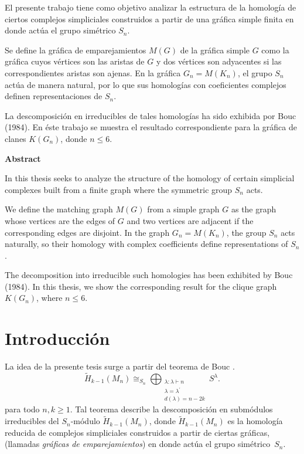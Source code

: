 \documentclass[12pt]{book}
\theoremstyle{definition}
\newcounter{in}
\newcounter{ini}
\begin{document}
El presente trabajo tiene como objetivo analizar la estructura de
la homología de ciertos complejos simpliciales construidos a partir de una
gráfica simple finita en donde actúa el grupo simétrico $S_{n}$.

Se define la gráfica de emparejamientos $M(G)$ de la gráfica simple
$G$ como la gráfica cuyos vértices son las aristas de $G$ y dos
vértices son adyacentes si las correspondientes aristas son ajenas. En
la gráfica $G_{n}=M(K_{n})$, el grupo $S_{n}$ actúa de manera natural, por
lo que sus homologías con coeficientes complejos definen
representaciones de $S_{n}$. 

La descomposición en irreducibles de tales homologías ha sido exhibida
por Bouc (1984). En éste trabajo se muestra el resultado correspondiente para la
gráfica de clanes $K(G_{n})$, donde $n\leq 6$.

\vspace{2cm}

\begin{flushleft}
  {\bfseries\Large Abstract}
\end{flushleft}

In this thesis seeks to analyze the structure of the homology of
certain simplicial complexes built from a finite graph where the
symmetric group $S_{n}$ acts. 

We define the matching graph $M(G)$ from a simple graph $G$ as 
the graph whose vertices are the edges of $G$ and two vertices are
adjacent if the corresponding edges are disjoint. In the graph
$G_{n}=M(K_{n})$, the group $S_{n}$ acts naturally, so their homology
with complex coefficients define representations of $S_{n}$. 

The decomposition into irreducible such homologies has been exhibited 
by Bouc (1984). In this thesis, we show the corresponding result for
the clique graph $K(G_{n})$, where $n\leq 6$.

\chapter*{Introducción}

La idea de la presente tesis surge a partir del teorema de Bouc
\cite{MR756517}. 
\begin{equation*}
  \widetilde H_{k-1}(M_{n})\cong_{S_{n}}\bigoplus_{\substack{\lambda:\lambda\vdash n\\
      \lambda=\lambda^{'}\\d(\lambda)=n-2k}} S^{\lambda}.
\end{equation*}
para todo $n,k\geq1$. Tal teorema describe la descomposición en
submódulos irreducibles del $S_{n}$-módulo $\widetilde
H_{k-1}(M_{n})$, donde $\widetilde H_{k-1}(M_{n})$ es la homología
reducida de complejos simpliciales construidos a partir de ciertas
gráficas, (llamadas \emph{gráficas de emparejamientos}) en donde actúa
el grupo simétrico~$S_{n}$.
\end{document}
